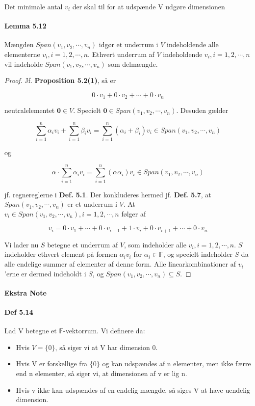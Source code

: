\documentclass[paper=a4, fontsize=11pt]{scrartcl} %
\begin{document}
	Det minimale antal $v_i$ der skal til for at udspænde V udgøre dimensionen
	
	
	\paragraph{Lemma 5.12}
	
	Mængden $Span(v_1,v_2,\cdots,v_n)$ idgør et underrum i $V$ indeholdende alle elementerne $v_i, i = 1,2,\cdots,n$. Ethvert underrum af $V$ indeholdende $v_i, i = 1,2,\cdots,n$ vil indeholde $Span(v_1,v_2,\cdots,v_n)$ som delmængde.
	
	
	\begin{proof}
		
		Jf. \textbf{Proposition 5.2(1)}, så er
		
		\[0 \cdot v_1 + 0 \cdot v_2 + \cdots + 0 \cdot v_n\]
		
		neutralelementet $\textbf{0} \in V$. Specielt $\textbf{0} \in Span(v_1,v_2,\cdots,v_n)$. Desuden gælder
		
		\[\sum_{i=1}^n \alpha_i v_i + \sum_{i=1}^n \beta_i v_i = \sum_{i=1}^n (\alpha_i + \beta_i) v_i \in Span(v_1,v_2,\cdots,v_n)\]
		
		og
		
		\[\alpha \cdot \sum_{i=1}^n \alpha_i v_i = \sum_{i=1}^n(\alpha \alpha_i)v_i \in Span(v_1,v_2,\cdots,v_n)\]
		
		jf. regnereglerne i \textbf{Def. 5.1}. Der konkluderes hermed jf. \textbf{Def. 5.7}, at  $Span(v_1,v_2,\cdots,v_n)$ er et underrum i $V$. At $v_i \in Span(v_1,v_2,\cdots,v_n), i = 1,2,\cdots,n$ følger af
		
		\[v_i = 0 \cdot v_1 + \cdots + 0 \cdot v_{i-1} + 1 \cdot v_i + 0 \cdot v_{i+1} + \cdots + 0 \cdot v_n\]
		
		Vi lader nu $S$ betegne et underrum af $V$, som indeholder alle $v_i, i = 1,2,\cdots,n$. $S$ indeholder ethvert element på formen $\alpha_i v_i$ for $\alpha_i \in \mathbb{F}$, og specielt indeholder $S$ da alle endelige summer af elementer af denne form. Alle linearkombinationer af $v_i$'erne er dermed indeholdt i $S$, og $Span(v_1,v_2,\cdots,v_n) \subseteq S$. 
		
	\end{proof}
	
	\paragraph{Ekstra Note}
	
	\paragraph{Def 5.14} Lad V betegne et $\mathbb{F}$-vektorrum. Vi definere da:
	\begin{itemize}
		\item Hvis $V=\{0\}$, så siger vi at V har dimension 0.
		\item Hvis V er forskellige fra $\{0\}$ og kan udspændes af n elementer, men ikke færre end n elementer, så siger vi, at dimensionen af v er lig n. 
		\item Hvis v ikke kan udspændes af en endelig mængde, så siges V at have uendelig dimension. 
	\end{itemize}
	
\end{document}
